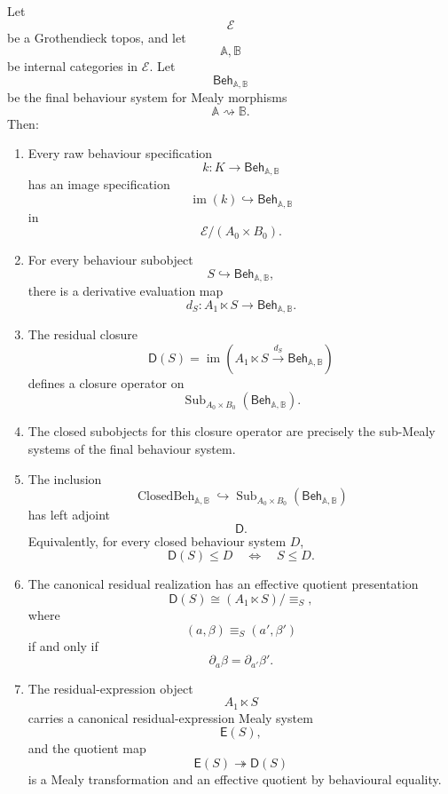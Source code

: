 \begin{theorem}
\label{thm:canonical-residual-closure-main}
Let
\[
\mathcal E
\]
be a Grothendieck topos, and let
\[
\mathbb A,\mathbb B
\]
be internal categories in \(\mathcal E\). Let
\[
\mathsf{Beh}_{\mathbb A,\mathbb B}
\]
be the final behaviour system for Mealy morphisms
\[
\mathbb A\rightsquigarrow\mathbb B.
\]
Then:
\begin{enumerate}
\item Every raw behaviour specification
\[
k:K\to\mathsf{Beh}_{\mathbb A,\mathbb B}
\]
has an image specification
\[
\operatorname{im}(k)\hookrightarrow\mathsf{Beh}_{\mathbb A,\mathbb B}
\]
in
\[
\mathcal E/(A_0\times B_0).
\]

\item For every behaviour subobject
\[
S\hookrightarrow\mathsf{Beh}_{\mathbb A,\mathbb B},
\]
there is a derivative evaluation map
\[
d_S:
A_1\ltimes S\to\mathsf{Beh}_{\mathbb A,\mathbb B}.
\]

\item The residual closure
\[
\mathsf D(S)
=
\operatorname{im}
\left(
A_1\ltimes S
\xrightarrow{d_S}
\mathsf{Beh}_{\mathbb A,\mathbb B}
\right)
\]
defines a closure operator on
\[
\operatorname{Sub}_{A_0\times B_0}
(\mathsf{Beh}_{\mathbb A,\mathbb B}).
\]

\item The closed subobjects for this closure operator are precisely the
sub-Mealy systems of the final behaviour system.

\item The inclusion
\[
\operatorname{ClosedBeh}_{\mathbb A,\mathbb B}
\hookrightarrow
\operatorname{Sub}_{A_0\times B_0}
(\mathsf{Beh}_{\mathbb A,\mathbb B})
\]
has left adjoint
\[
\mathsf D.
\]
Equivalently, for every closed behaviour system \(D\),
\[
\mathsf D(S)\leq D
\quad\Longleftrightarrow\quad
S\leq D.
\]

\item The canonical residual realization has an effective quotient
presentation
\[
\mathsf D(S)
\cong
(A_1\ltimes S)/{\equiv_S},
\]
where
\[
(a,\beta)\equiv_S(a',\beta')
\]
if and only if
\[
\partial_a\beta=\partial_{a'}\beta'.
\]

\item The residual-expression object
\[
A_1\ltimes S
\]
carries a canonical residual-expression Mealy system
\[
\mathsf E(S),
\]
and the quotient map
\[
\mathsf E(S)\twoheadrightarrow\mathsf D(S)
\]
is a Mealy transformation and an effective quotient by behavioural equality.


\end{enumerate}
\end{theorem}
